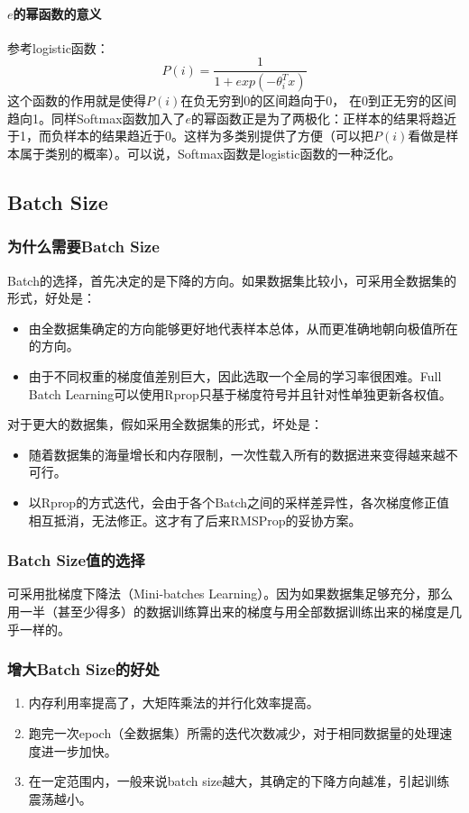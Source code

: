 \documentclass[UTF8]{ctexart}
\begin{document}
\paragraph{$e$的幂函数的意义}
参考logistic函数：
$$P(i) = \frac{1}{1+exp(-\theta_i^T x)}$$
这个函数的作用就是使得$P(i)$在负无穷到0的区间趋向于0， 在0到正无穷的区间趋向1。同样Softmax函数加入了$e$的幂函数正是为了两极化：正样本的结果将趋近于1，而负样本的结果趋近于0。这样为多类别提供了方便（可以把$ P(i) $看做是样本属于类别的概率）。可以说，Softmax函数是logistic函数的一种泛化。

\subsection{Batch Size}
\subsubsection{为什么需要Batch Size}
Batch的选择，首先决定的是下降的方向。如果数据集比较小，可采用全数据集的形式，好处是：
\begin{itemize}
	\item 由全数据集确定的方向能够更好地代表样本总体，从而更准确地朝向极值所在的方向。
	\item 由于不同权重的梯度值差别巨大，因此选取一个全局的学习率很困难。Full Batch Learning可以使用Rprop只基于梯度符号并且针对性单独更新各权值。
\end{itemize}
对于更大的数据集，假如采用全数据集的形式，坏处是：
\begin{itemize}
	\item 随着数据集的海量增长和内存限制，一次性载入所有的数据进来变得越来越不可行。
	\item 以Rprop的方式迭代，会由于各个Batch之间的采样差异性，各次梯度修正值相互抵消，无法修正。这才有了后来RMSProp的妥协方案。 
\end{itemize}
\subsubsection{Batch Size值的选择}
可采用批梯度下降法（Mini-batches Learning）。因为如果数据集足够充分，那么用一半（甚至少得多）的数据训练算出来的梯度与用全部数据训练出来的梯度是几乎一样的。
\subsubsection{增大Batch Size的好处}
\begin{enumerate}
	\item 内存利用率提高了，大矩阵乘法的并行化效率提高。
	\item 跑完一次epoch（全数据集）所需的迭代次数减少，对于相同数据量的处理速度进一步加快。
	\item 在一定范围内，一般来说batch size越大，其确定的下降方向越准，引起训练震荡越小。
\end{enumerate}
\end{document}

